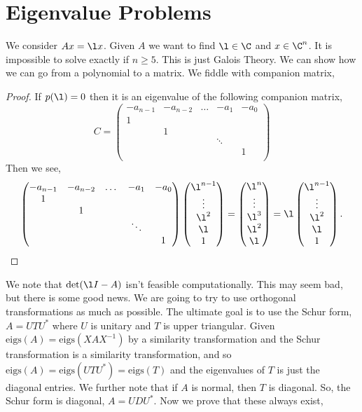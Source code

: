 
\section{Eigenvalue Problems}
We consider $Ax = \l x$. Given $A$ we want to find $\l \in \C$ and $x \in \C^n$. It is impossible to solve exactly if $n \ge 5$. This is just Galois Theory. We can show how we can go from a polynomial to a matrix. We fiddle with companion matrix,
\begin{proof}
  If $p(\l) = 0$ then it is an eigenvalue of the following companion matrix,
  $$ C = \begin{pmatrix}
    -a_{n-1} & -a_{n-2} & \dots & -a_1 & -a_0 \\
    1 & & & & \\
    & 1 & & & \\
    & & & \ddots & \\
     & & & & 1 \\
  \end{pmatrix} $$
  Then we see,
  $$ \begin{pmatrix}
    -a_{n-1} & -a_{n-2} & \dots & -a_1 & -a_0 \\
    1 & & & & \\
    & 1 & & & \\
    & & & \ddots & \\
     & & & & 1 \\
  \end{pmatrix} \begin{pmatrix}
    \l^{n-1} \\ \vdots \\ \l^2 \\ \l \\ 1
  \end{pmatrix} = \begin{pmatrix}
    \l^n \\ \vdots \\ \l^3 \\ \l^2 \\ \l
  \end{pmatrix} = \l \begin{pmatrix}
    \l^{n-1} \\ \vdots \\ \l^2 \\ \l \\ 1
  \end{pmatrix}. $$
\end{proof}
\noindent
We note that $\det (\l I - A)$ isn't feasible computationally. This may seem bad, but there is some good news. We are going to try to use orthogonal transformations as much as possible. The ultimate goal is to use the Schur form, $A = UTU^*$ where $U$ is unitary and $T$ is upper triangular. Given $\mathrm{eigs}(A) = \mathrm{eigs}(XAX^{-1})$ by a similarity transformation and the Schur transformation is a similarity transformation, and so $\mathrm{eigs}(A) = \mathrm{eigs}(UTU^*) = \mathrm{eigs}(T)$ and the eigenvalues of $T$ is just the diagonal entries. We further note that if $A$ is normal, then $T$ is diagonal. So, the Schur form is diagonal, $A = UDU^*$. Now we prove that these always exist,
